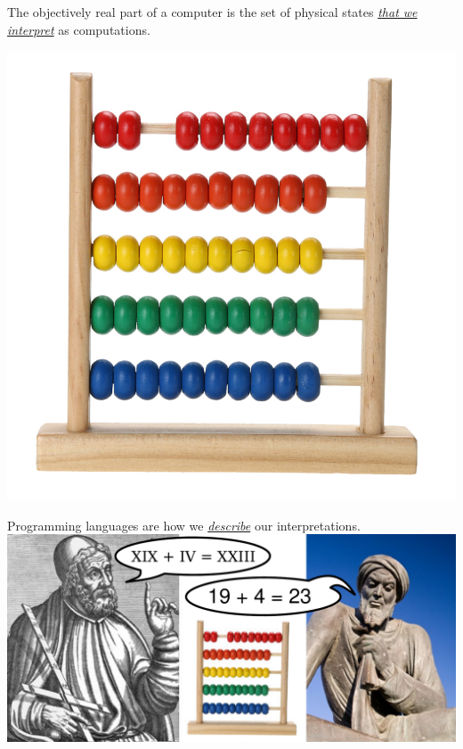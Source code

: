 \documentclass[aspectratio=169]{beamer}
\begin{document}
\begin{frame}{}
\LARGE
\vspace{1 cm}
\begin{center}
The objectively real part of a computer is the set of physical states \underline{\it that we interpret} as computations.

\vspace{0.2 cm}
\includegraphics[width=0.4\linewidth]{abacus.jpg}
\end{center}
\end{frame}

\begin{frame}{Programming languages are how we \underline{\it describe} our interpretations.}
\Large
\vspace{0.75 cm}
\includegraphics[width=\linewidth]{abacus_ptolemy_al-khwarizmi.pdf}

\vspace{-0.2 cm}
\begin{center}
\end{center}
\end{frame}
\end{document}
